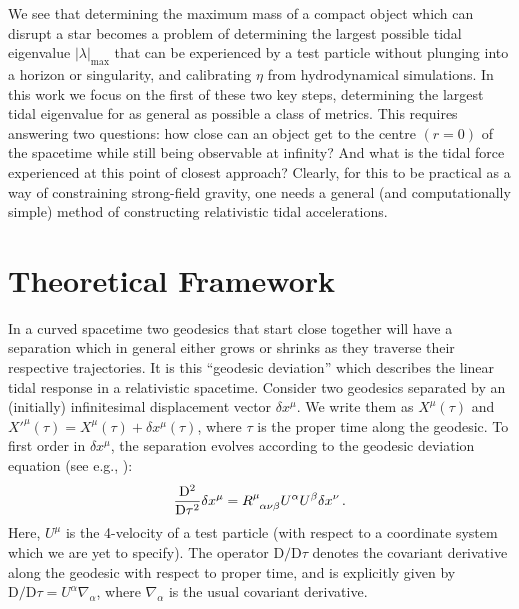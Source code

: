 \documentclass[
    reprint,
    prd,
    nofootinbib,
    amsmath,amssymb,
    aps,
    floatfix,
]{revtex4-2}
\begin{document}
We see that determining the maximum mass of a compact object which can disrupt a star becomes a problem of determining the largest possible tidal eigenvalue $\left\lvert \lambda \right\rvert_{\text{max}}$ that can be experienced by a test particle without plunging into a horizon or singularity{, and calibrating $\eta$ from hydrodynamical simulations. In this work we focus on the first of these two key steps, determining the largest tidal eigenvalue for as general as possible a class of metrics.} This requires answering two questions: how close can an object get to the centre $(r=0)$ of the spacetime while still being observable at infinity? And what is the tidal force experienced at this point of closest approach? Clearly, for this to be practical as a way of constraining strong-field gravity, one needs a general (and computationally simple) method of constructing relativistic tidal accelerations. 


\section{Theoretical Framework} \label{sec:theory}


In a curved spacetime two geodesics that start close together will have a separation which in general either grows or shrinks as they traverse their respective trajectories. It is this ``geodesic deviation'' which describes the linear tidal response in a relativistic spacetime. Consider two geodesics separated by an (initially) infinitesimal displacement vector $\delta x^{\mu}$. We write them as $X^{\mu}(\tau)$ and $X'^{\mu}(\tau) = X^{\mu}(\tau) + \delta x^{\mu}(\tau)$, where $\tau$ is the proper time along the geodesic. To first order in $\delta x^{\mu}$, the separation evolves according to the geodesic deviation equation (see e.g., \cite[Chapter 7]{Hobson2006}):
\begin{equation}
    \frac{\mathrm{D}^{2}}{\mathrm{D} \tau^{2}} \delta x^{\mu} = \tensor{R}{^{\mu}_{\alpha \nu \beta}} U^{\alpha} U^{\beta} \delta x^{\nu} \, .
    \label{eq:geodesic_deviation}
\end{equation}
Here, $U^\mu$ is the 4-velocity of a test particle (with respect to a coordinate system which we are yet to specify). The operator $\mathrm{D}/\mathrm{D}\tau$ denotes the covariant derivative along the geodesic with respect to proper time, and is explicitly given by ${\mathrm{D}}/{\mathrm{D}}\tau = U^{\alpha} \nabla_{\alpha}$, where $\nabla_\alpha$ is the usual covariant derivative.
\end{document}
